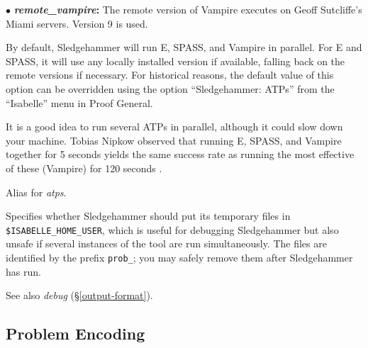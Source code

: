 \documentclass[a4paper,12pt]{article}
\begin{document}
\begin{enum}
\begin{enum}
\item[$\bullet$] \textbf{\textit{remote\_vampire}:} The remote version of
Vampire executes on Geoff Sutcliffe's Miami servers. Version 9 is used.

\end{enum}

By default, Sledgehammer will run E, SPASS, and Vampire in parallel. For E and
SPASS, it will use any locally installed version if available, falling back
on the remote versions if necessary. For historical reasons, the default value
of this option can be overridden using the option ``Sledgehammer: ATPs'' from
the ``Isabelle'' menu in Proof General.

It is a good idea to run several ATPs in parallel, although it could slow down
your machine. Tobias Nipkow observed that running E, SPASS, and Vampire together
for 5 seconds yields the same success rate as running the most effective of
these (Vampire) for 120 seconds \cite{boehme-nipkow-2010}.

Alias for \textit{atps}.

Specifies whether Sledgehammer should put its temporary files in
\texttt{\$ISA\-BELLE\_\allowbreak HOME\_\allowbreak USER}, which is useful for
debugging Sledgehammer but also unsafe if several instances of the tool are run
simultaneously. The files are identified by the prefix \texttt{prob\_}; you may
safely remove them after Sledgehammer has run.

\nopagebreak
{\small See also \textit{debug} (\S\ref{output-format}).}
\end{enum}

\subsection{Problem Encoding}
\label{problem-encoding}
\end{document}
